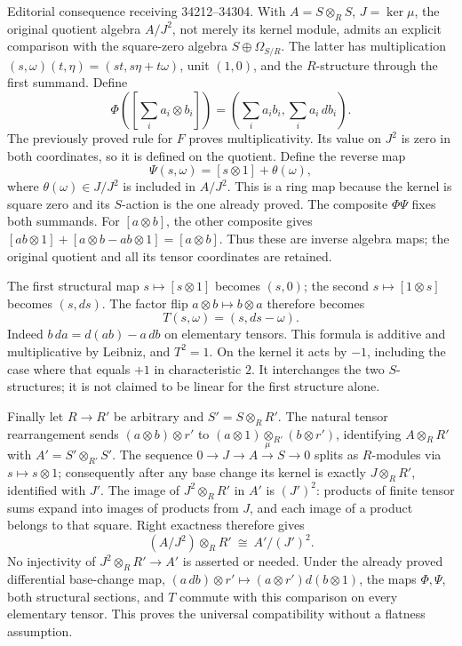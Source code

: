 Editorial consequence receiving 34212--34304. With \(A=S\otimes_R S\), \(J=\ker\mu\), the original quotient algebra \(A/J^2\), not merely its kernel module, admits an explicit comparison with the square-zero algebra \(S\oplus\Omega_{S/R}\). The latter has multiplication \((s,\omega)(t,\eta)=(st,s\eta+t\omega)\), unit \((1,0)\), and the \(R\)-structure through the first summand. Define \[
\Phi\left(\left[\sum_i a_i\otimes b_i\right]\right)
=\left(\sum_i a_ib_i,\sum_i a_i\,db_i\right).
\] The previously proved rule for \(F\) proves multiplicativity. Its value on \(J^2\) is zero in both coordinates, so it is defined on the quotient. Define the reverse map \[
\Psi(s,\omega)=[s\otimes1]+\theta(\omega),
\] where \(\theta(\omega)\in J/J^2\) is included in \(A/J^2\). This is a ring map because the kernel is square zero and its \(S\)-action is the one already proved. The composite \(\Phi\Psi\) fixes both summands. For \([a\otimes b]\), the other composite gives \([ab\otimes1]+[a\otimes b-ab\otimes1]=[a\otimes b]\). Thus these are inverse algebra maps; the original quotient and all its tensor coordinates are retained.

The first structural map \(s\mapsto[s\otimes1]\) becomes \((s,0)\); the second \(s\mapsto[1\otimes s]\) becomes \((s,ds)\). The factor flip \(a\otimes b\mapsto b\otimes a\) therefore becomes \[
T(s,\omega)=(s,ds-\omega).
\] Indeed \(b\,da=d(ab)-a\,db\) on elementary tensors. This formula is additive and multiplicative by Leibniz, and \(T^2=1\). On the kernel it acts by \(-1\), including the case where that equals \(+1\) in characteristic \(2\). It interchanges the two \(S\)-structures; it is not claimed to be linear for the first structure alone.

Finally let \(R\to R'\) be arbitrary and \(S'=S\otimes_R R'\). The natural tensor rearrangement sends \((a\otimes b)\otimes r'\) to \((a\otimes1)\otimes_{R'}(b\otimes r')\), identifying \(A\otimes_R R'\) with \(A'=S'\otimes_{R'}S'\). The sequence \(0\to J\to A\xrightarrow\mu S\to0\) splits as \(R\)-modules via \(s\mapsto s\otimes1\); consequently after any base change its kernel is exactly \(J\otimes_R R'\), identified with \(J'\). The image of \(J^2\otimes_R R'\) in \(A'\) is \((J')^2\): products of finite tensor sums expand into images of products from \(J\), and each image of a product belongs to that square. Right exactness therefore gives \[
(A/J^2)\otimes_R R'\ \cong\ A'/(J')^2.
\] No injectivity of \(J^2\otimes_R R'\to A'\) is asserted or needed. Under the already proved differential base-change map, \((a\,db)\otimes r'\mapsto(a\otimes r')d(b\otimes1)\), the maps \(\Phi,\Psi\), both structural sections, and \(T\) commute with this comparison on every elementary tensor. This proves the universal compatibility without a flatness assumption.

